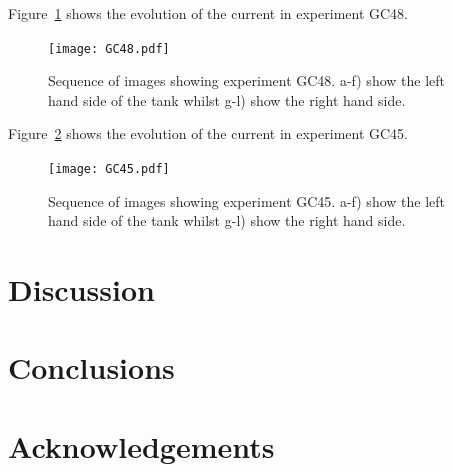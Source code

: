 \documentclass[authoryear,preprint,review,12pt]{elsarticle}
\begin{document}
Figure~\ref{fig:GC48} shows the evolution of the current in experiment GC48.

\begin{figure}[ht!]
  \centerline{\texttt{[image: GC48.pdf]}}
  \caption{Sequence of images showing experiment GC48. a-f) show the left hand side of the tank whilst g-l) show the right hand side.}
  \label{fig:GC48}
\end{figure}

Figure~\ref{fig:GC45} shows the evolution of the current in experiment GC45.

\begin{figure}[ht!]
  \centerline{\texttt{[image: GC45.pdf]}}
  \caption{Sequence of images showing experiment GC45. a-f) show the left hand side of the tank whilst g-l) show the right hand side.}
  \label{fig:GC45}
\end{figure}

\section{Discussion}
\label{sec:dis}

\section{Conclusions}
\label{sec:conc}

\section*{Acknowledgements}
\label{sec:acknow}




 






\end{document}
